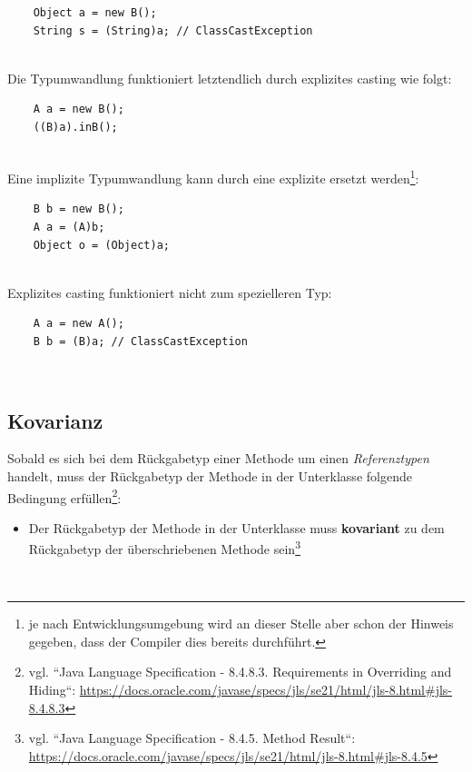 \begin{verbatim}
    Object a = new B();
    String s = (String)a; // ClassCastException
\end{verbatim}\\

\noindent
Die Typumwandlung funktioniert letztendlich durch explizites casting wie folgt:

\begin{verbatim}
    A a = new B();
    ((B)a).inB();
\end{verbatim}\\

Eine implizite Typumwandlung kann durch eine explizite ersetzt werden\footnote{
    je nach Entwicklungsumgebung wird an dieser Stelle aber schon der Hinweis gegeben, dass der Compiler dies bereits durchführt.
}:

\begin{verbatim}
    B b = new B();
    A a = (A)b;
    Object o = (Object)a;
\end{verbatim}\\

Explizites casting funktioniert nicht zum spezielleren Typ:

\begin{verbatim}
    A a = new A();
    B b = (B)a; // ClassCastException
\end{verbatim}\\


\subsection{Kovarianz}\label{subsec:covariance}
Sobald es sich bei dem Rückgabetyp einer Methode um einen \textit{Referenztypen} handelt, muss der Rückgabetyp der Methode in der Unterklasse folgende Bedingung erfüllen\footnote{
    vgl. ``Java Language Specification - 8.4.8.3. Requirements in Overriding and Hiding``: \url{https://docs.oracle.com/javase/specs/jls/se21/html/jls-8.html#jls-8.4.8.3}
}:

\begin{itemize}
    \item Der Rückgabetyp der Methode in der Unterklasse muss \textbf{kovariant} zu dem Rückgabetyp der überschriebenen Methode sein\footnote{
        vgl. ``Java Language Specification - 8.4.5. Method Result``: \url{https://docs.oracle.com/javase/specs/jls/se21/html/jls-8.html#jls-8.4.5}
    }
\end{itemize}\\

